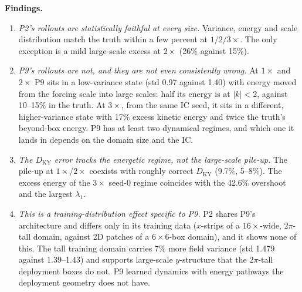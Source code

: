 \documentclass[11pt]{article}
\begin{document}
\textbf{Findings.}
\begin{enumerate}[leftmargin=*]
\item \emph{P2's rollouts are statistically faithful at every size.}
  Variance, energy and scale distribution match the truth within a few
  percent at $1/2/3\times$. The only exception is a mild large-scale
  excess at $2\times$ (26\% against 15\%).
\item \emph{P9's rollouts are not, and they are not even consistently
  wrong.} At $1\times$ and $2\times$ P9 sits in a low-variance state
  (std 0.97 against 1.40) with energy moved from the forcing scale into
  large scales: half its energy is at $|k|<2$, against 10--15\% in the
  truth. At $3\times$, from the same IC seed, it sits in a different,
  higher-variance state with 17\% excess kinetic energy and twice the
  truth's beyond-box energy. P9 has at least two dynamical regimes, and
  which one it lands in depends on the domain size and the IC.
\item \emph{The $D_{\mathrm{KY}}$ error tracks the energetic regime, not
  the large-scale pile-up.} The pile-up at $1\times$/$2\times$ coexists
  with roughly correct $D_{\mathrm{KY}}$ (9.7\%, 5--8\%). The excess
  energy of the $3\times$ seed-0 regime coincides with the 42.6\%
  overshoot and the largest $\lambda_1$.
\item \emph{This is a training-distribution effect specific to P9.} P2
  shares P9's architecture and differs only in its training data
  ($x$-strips of a $16\times$-wide, $2\pi$-tall domain, against 2D
  patches of a $6\times6$-box domain), and it shows none of this. The
  tall training domain carries 7\% more field variance (std 1.479
  against 1.39--1.43) and supports large-scale $y$-structure that the
  $2\pi$-tall deployment boxes do not. P9 learned dynamics with energy
  pathways the deployment geometry does not have.
\end{enumerate}
\end{document}
